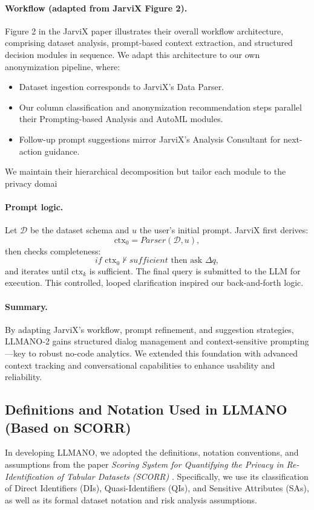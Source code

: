 \documentclass{article}
\begin{document}
\paragraph{Workflow (adapted from JarviX Figure 2).}
Figure 2 in the JarviX paper \cite{jarvix} illustrates their overall workflow architecture, comprising dataset analysis, prompt-based context extraction, and structured decision modules in sequence. We adapt this architecture to our own anonymization pipeline, where:
\begin{itemize}
    \item Dataset ingestion corresponds to JarviX's Data Parser.
    \item Our column classification and anonymization recommendation steps parallel their Prompting-based Analysis and AutoML modules.
    \item Follow-up prompt suggestions mirror JarviX's Analysis Consultant for next-action guidance.
\end{itemize}
We maintain their hierarchical decomposition but tailor each module to the privacy domai

\paragraph{Prompt logic.}
Let $\mathcal{D}$ be the dataset schema and $u$ the user's initial prompt. JarviX first derives:
\[
\mathrm{ctx}_0 = \textit{Parser}(\mathcal{D}, u),
\]
then checks completeness:
\[
\textit{if } \mathrm{ctx}_0 \not\vdash \textit{sufficient} \text{ then ask }\Delta q,
\]
and iterates until $\mathrm{ctx}_k$ is sufficient. The final query is submitted to the LLM for execution. This controlled, looped clarification inspired our back-and-forth logic.

\paragraph{Summary.}
By adapting JarviX’s workflow, prompt refinement, and suggestion strategies, LLMANO‑2 gains structured dialog management and context-sensitive prompting—key to robust no-code analytics. We extended this foundation with advanced context tracking and conversational capabilities to enhance usability and reliability.
\subsection{Definitions and Notation Used in LLMANO (Based on SCORR)}

In developing LLMANO, we adopted the definitions, notation conventions, and assumptions from the paper \emph{Scoring System for Quantifying the Privacy in Re-Identification of Tabular Datasets (SCORR)} . Specifically, we use its classification of Direct Identifiers (DIs), Quasi-Identifiers (QIs), and Sensitive Attributes (SAs), as well as its formal dataset notation and risk analysis assumptions.
\end{document}
